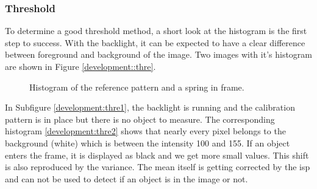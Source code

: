 \subsubsection{Threshold}
To determine a good threshold method, a short look at the histogram is the first step to success.
With the backlight, it can be expected to have a clear difference between foreground and background of the image.
Two images with it's histogram are shown in Figure \ref{development::thre}.
\begin{figure}[ht]
	\centering
	\caption{Histogram of the reference pattern and a spring in frame.\label{development:thre}}	
\end{figure}
In Subfigure \ref{development:thre1}, the backlight is running and the calibration pattern is in place but there is no object to measure.
The corresponding histogram \ref{development:thre2} shows that nearly every pixel belongs to the background (white) which is between the intensity 100 and 155.
If an object enters the frame, it is displayed as black and we get more small values.
This shift is also reproduced by the variance.
The mean itself is getting corrected by the \acs{isp} and can not be used to detect if an object is in the image or not.

